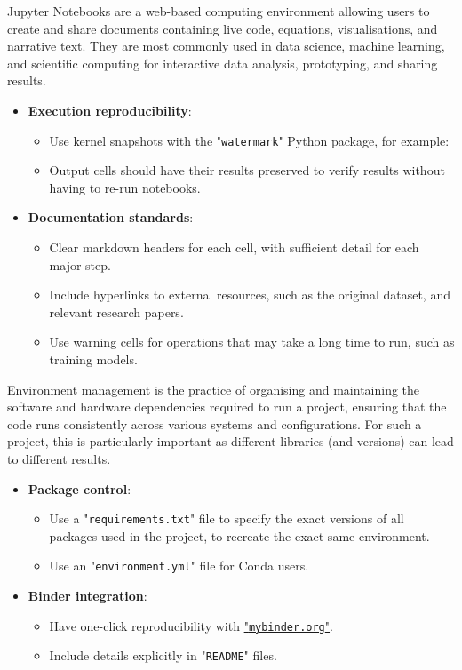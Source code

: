 \noindent Jupyter Notebooks are a web-based computing environment allowing users to create and share documents containing live code, equations, visualisations, and narrative text. They are most commonly used in data science, machine learning, and scientific computing for interactive data analysis, prototyping, and sharing results.

\begin{itemize}
  \item \textbf{Execution reproducibility}:
  \begin{itemize}
    \item Use kernel snapshots with the "\texttt{watermark}" Python package, for example:
    \begin{ffcode}
    \end{ffcode}
    \item Output cells should have their results preserved to verify results without having to re-run notebooks.
  \end{itemize}
\item \textbf{Documentation standards}:
  \begin{itemize}
    \item Clear markdown headers for each cell, with sufficient detail for each major step.
    \item Include hyperlinks to external resources, such as the original dataset, and relevant research papers.
    \item Use warning cells for operations that may take a long time to run, such as training models.
  \end{itemize}
\end{itemize}

\noindent Environment management is the practice of organising and maintaining the software and hardware dependencies required to run a project, ensuring that the code runs consistently across various systems and configurations. For such a project, this is particularly important as different libraries (and versions) can lead to different results.

\begin{itemize}
  \item \textbf{Package control}:
  \begin{itemize}
    \item Use a "\texttt{requirements.txt}" file to specify the exact versions of all packages used in the project, to recreate the exact same environment.
    \item Use an "\texttt{environment.yml}" file for Conda users.
  \end{itemize}
  \item \textbf{Binder integration}:
  \begin{itemize}
    \item Have one-click reproducibility with \href{https://mybinder.org}{"\texttt{mybinder.org}"}.
    \item Include details explicitly in "\texttt{README}" files.
  \end{itemize}
\end{itemize}
